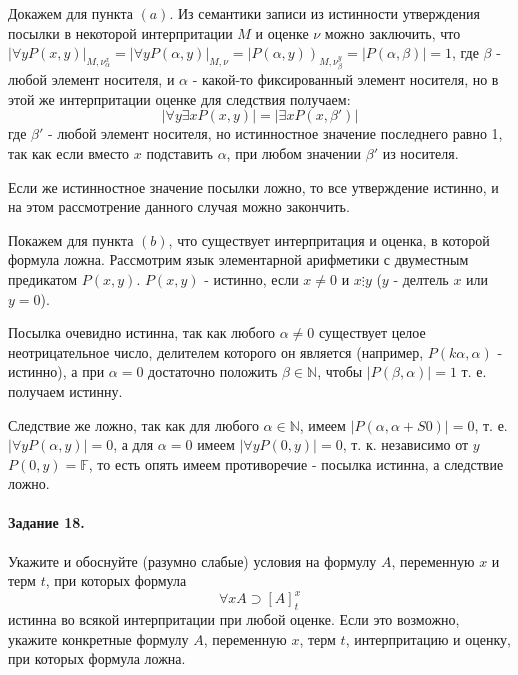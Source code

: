\documentclass[a4paper,12pt]{article}
\begin{document}
\begin{Solution}
Докажем для пункта $(a)$. Из семантики записи из истинности утверждения посылки в некоторой интерпритации $M$ и оценке $\nu$ можно заключить, что $\left|\forall y P\left(x,y\right)\right|_{M, \nu_{\alpha}^x} = \left|\forall y P\left(\alpha,y\right)\right|_{M,\nu} = \left|P\left(\alpha,y\right)\right)_{M,\nu_{\beta}^y} = \left|P\left(\alpha,\beta\right)\right| = 1$, где $\beta$ - любой элемент носителя, и $\alpha$ - какой-то фиксированный элемент носителя, но в этой же интерпритации оценке для следствия получаем:
\[
	\left|\forall y \exists x P\left(x,y\right)\right| = \left|\exists x P\left(x, \beta'\right)\right|
\]
где $\beta'$ - любой элемент носителя, но истинностное значение последнего равно 1, так как если вместо $x$ подставить $\alpha$, при любом значении $\beta'$ из носителя.

Если же истинностное значение посылки ложно, то все утверждение истинно, и на этом рассмотрение данного случая можно закончить.

Покажем для пункта $(b)$, что существует интерпритация и оценка, в которой формула ложна. Рассмотрим язык элементарной арифметики с двуместным предикатом $P\left(x,y\right)$. $P\left(x,y\right)$ - истинно, если $x \not= 0$ и $x \vdots y$ ($y$ - делтель $x$ или $y = 0$).

Посылка очевидно истинна, так как любого $\alpha \not= 0$ существует целое неотрицательное число, делителем которого он является (например, $P\left(k\alpha,\alpha\right)$ - истинно), а при $\alpha = 0$ достаточно положить $\beta \in \mathbb{N}$, чтобы $\left|P\left(\beta,\alpha\right)\right| = 1$ т. е. получаем истинну.

Следствие же ложно, так как для любого $\alpha \in \mathbb{N}$, имеем $\left|P\left(\alpha,\alpha + S0\right)\right| = 0$, т. е. $\left|\forall y P\left(\alpha, y\right)\right| = 0$, а для $\alpha = 0$ имеем $\left|\forall y P\left(0,y\right)\right| = 0$, т. к. независимо от $y$ $P\left(0,y\right) = \mathbb{F}$, то есть опять имеем противоречие - посылка истинна, а следствие ложно.
\end{Solution}

\paragraph{Задание 18.} Укажите и обоснуйте (разумно слабые) условия на формулу $A$, переменную $x$ и терм $t$, при которых формула
\[
	\forall x A \supset \left[A\right]_{t}^{x}
\]
истинна во всякой интерпритации при любой оценке. Если это возможно, укажите конкретные формулу $A$, переменную $x$, терм $t$, интерпритацию и оценку, при которых формула ложна.
\end{document}
